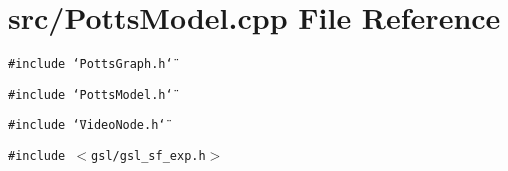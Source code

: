 \section{src/PottsModel.cpp File Reference}
\label{PottsModel_8cpp}
{\tt \#include \char`\"{}PottsGraph.h\char`\"{}}\par
{\tt \#include \char`\"{}PottsModel.h\char`\"{}}\par
{\tt \#include \char`\"{}VideoNode.h\char`\"{}}\par
{\tt \#include $<$gsl/gsl\_\-sf\_\-exp.h$>$}\par
